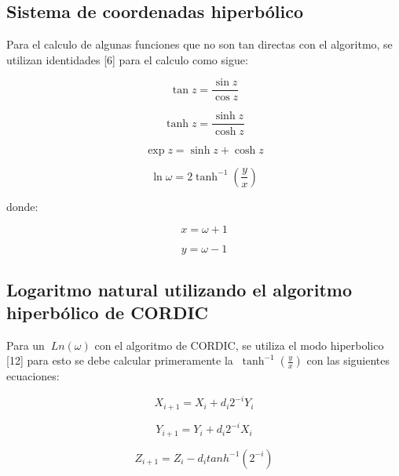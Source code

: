 \subsection{Sistema de coordenadas hiperbólico}

Para el calculo de algunas funciones que no son tan directas con el algoritmo, se utilizan identidades [6] para el calculo como sigue:

\begin{equation} \label{eq:ej17}
  \tan z = \frac{\sin z}{\cos z}
\end{equation}

\begin{equation} \label{eq:ej18}
  \tanh z = \frac{\sinh z}{\cosh z}
\end{equation}

\begin{equation} \label{eq:ej19}
  \exp z = \sinh z + \cosh z
\end{equation}

\begin{equation} \label{eq:ej20}
  \ln \omega = 2 \tanh^{-1} \left( \frac{y}{x} \right)
\end{equation}

donde: 

\begin{equation} \label{eq:ej21}
  x = \omega + 1
\end{equation}

\begin{equation} \label{eq:ej22}
  y = \omega - 1
\end{equation}

\subsection{Logaritmo natural utilizando el algoritmo hiperbólico de CORDIC}
Para un $\ Ln \left(\omega\right) $  con el algoritmo de CORDIC, se utiliza el modo hiperbolico [12] para esto se debe calcular primeramente la $\ \tanh^{-1} \left( \frac{y}{x} \right)$ con las siguientes ecuaciones:

 
\begin{equation} \label{eq:ej23}
  X_{i+1} = X_{i} + d_{i} 2^{-i} Y_{i}  
\end{equation}

\begin{equation} \label{eq:ej24}
  Y_{i+1} = Y_{i} + d_{i} 2^{-i} X_{i}  
\end{equation}

\begin{equation} \label{eq:ej25}
  Z_{i+1} = Z_{i} - d_{i} tanh^{-1}\left(2^{-i}\right)
\end{equation}

